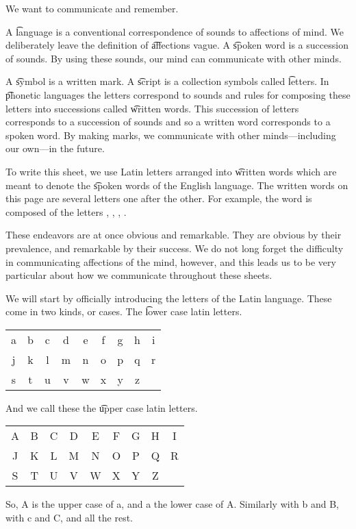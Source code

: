 

We want to communicate and remember.


A \t{language} is a conventional correspondence of sounds to affections of mind.
We deliberately leave the definition of \t{affections} vague.
A \t{spoken word} is a succession of sounds.
By using these sounds, our mind can communicate with other minds.

A \t{symbol} is a written mark.
A \t{script} is a collection symbols called \t{letters}.
In \t{phonetic} languages the letters correspond to sounds and rules for composing these letters into successions called \t{written words}.
This succession of letters corresponds to a succession of sounds and so a written word corresponds to a spoken word.
By making marks, we communicate with other minds---including our own---in the future.

To write this sheet, we use Latin letters arranged into \t{written words} which are meant to denote the \t{spoken words} of the English language.
The written words on this page are several letters one after the other.
For example, the word  is composed of the letters , , , .

These endeavors are at once obvious and remarkable.
They are obvious by their prevalence, and remarkable by their success.
We do not long forget the difficulty in communicating affections of the mind, however, and this leads us to be very particular about how we communicate throughout these sheets.


We will start by officially introducing the letters of the Latin language.
These come in two kinds, or cases.
The \t{lower case latin letters}.
\begin{center}
\begin{tabular}{ccccccccc}
  a & b & c & d & e & f & g & h & i \\
  j & k & l & m & n & o & p & q & r \\
  s & t & u & v & w & x & y & z &   \\
\end{tabular}
\end{center}
And we call these the \t{upper case latin letters}.
\begin{center}
\begin{tabular}{ccccccccc}
  A & B & C & D & E & F & G & H & I \\
  J & K & L & M & N & O & P & Q & R \\
  S & T & U & V & W & X & Y & Z &   \\
\end{tabular}
\end{center}
So, A is the upper case of a, and a the lower case of A.
Similarly with b and B, with c and C, and all the rest.

